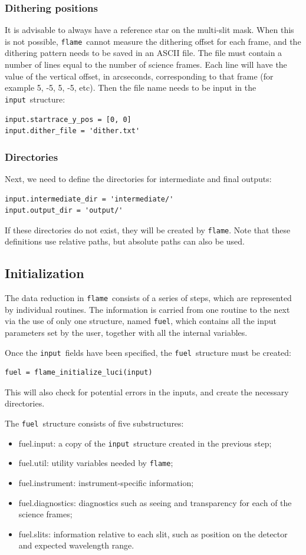 \documentclass[a4paper, notitlepage]{article}
\newcommand{\flame}{\texttt{flame}}
\newcommand{\fuel}{\texttt{fuel}}
\newcommand{\inp}{\texttt{input}}
\begin{document}
\subsubsection{Dithering positions}
It is advisable to always have a reference star on the multi-slit mask. When this is not possible, \flame\ cannot measure the dithering offset for each frame, and the dithering pattern needs to be saved in an ASCII file. The file must contain a number of lines equal to the number of science frames. Each line will have the value of the vertical offset, in arcseconds, corresponding to that frame (for example 5, -5, 5, -5, etc). Then the file name needs to be input in the \inp\ structure:
\begin{lstlisting}
input.startrace_y_pos = [0, 0]
input.dither_file = 'dither.txt'
\end{lstlisting}

\subsubsection{Directories}
Next, we need to define the directories for intermediate and final outputs:
\begin{lstlisting}
input.intermediate_dir = 'intermediate/'
input.output_dir = 'output/'
\end{lstlisting}
If these directories do not exist, they will be created by \flame. Note that these definitions use relative paths, but absolute paths can also be used.



\subsection{Initialization}

The data reduction in \flame\ consists of a series of steps, which are represented by individual routines. The information is carried from one routine to the next via the use of only one structure, named \fuel, which contains all the input parameters set by the user, together with all the internal variables.

Once the \inp\ fields have been specified, the \fuel\ structure must be created:
\begin{lstlisting}
fuel = flame_initialize_luci(input)
\end{lstlisting}
This will also check for potential errors in the inputs, and create the necessary directories.

The \fuel\ structure consists of five substructures:
\begin{itemize}
	\item fuel.input: a copy of the \inp\ structure created in the previous step;
	\item fuel.util: utility variables needed by \flame;
	\item fuel.instrument: instrument-specific information;
	\item fuel.diagnostics: diagnostics such as seeing and transparency for each of the science frames;
	\item fuel.slits: information relative to each slit, such as position on the detector and expected wavelength range.
\end{itemize}
\end{document}
